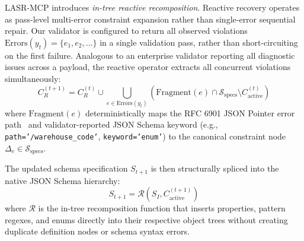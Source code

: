 LASR-MCP introduces \textit{in-tree reactive recomposition}. Reactive recovery operates as pass-level multi-error constraint expansion rather than single-error sequential repair. Our validator is configured to return all observed violations $\text{Errors}(y_t) = \{e_1, e_2, \dots\}$ in a single validation pass, rather than short-circuiting on the first failure. Analogous to an enterprise validator reporting all diagnostic issues across a payload, the reactive operator extracts all concurrent violations simultaneously:
\begin{equation}
\label{eq:reactive_op}
C_R^{(t+1)} = C_R^{(t)} \cup \bigcup_{e \in \text{Errors}(y_t)} \left( \text{Fragment}(e) \cap \mathcal{S}_{\text{specs}} \setminus C_{\text{active}}^{(t)} \right)
\end{equation}
where $\text{Fragment}(e)$ deterministically maps the RFC 6901 JSON Pointer error path~\cite{rfc6901} and validator-reported JSON Schema keyword (e.g., \texttt{path='/warehouse\_code'}, \texttt{keyword='enum'}) to the canonical constraint node $\Delta_e \in \mathcal{S}_{\text{specs}}$.

The updated schema specification $S_{t+1}$ is then structurally spliced into the native JSON Schema hierarchy:
\begin{equation}
S_{t+1} = \mathcal{R}\left( S_I, C_{\text{active}}^{(t+1)} \right)
\end{equation}
where $\mathcal{R}$ is the in-tree recomposition function that inserts properties, pattern regexes, and enums directly into their respective object trees without creating duplicate definition nodes or schema syntax errors.

